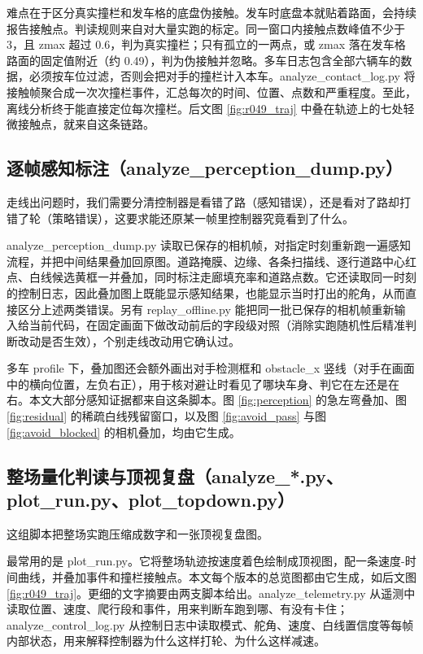 \documentclass[UTF8,a4paper]{ctexart}
\begin{document}
难点在于区分真实撞栏和发车格的底盘伪接触。发车时底盘本就贴着路面，会持续报告接触点。判读规则来自对大量实跑的标定。同一窗口内接触点数峰值不少于 3，且 zmax 超过 0.6，判为真实撞栏；只有孤立的一两点，或 zmax 落在发车格路面的固定值附近（约 0.49），判为伪接触并忽略。多车日志包含全部六辆车的数据，必须按车位过滤，否则会把对手的撞栏计入本车。analyze\_contact\_log.py 将接触帧聚合成一次次撞栏事件，汇总每次的时间、位置、点数和严重程度。至此，离线分析终于能直接定位每次撞栏。后文图 \ref{fig:r049_traj} 中叠在轨迹上的七处轻微接触点，就来自这条链路。

\subsection{逐帧感知标注（analyze\_perception\_dump.py）}

走线出问题时，我们需要分清控制器是看错了路（感知错误），还是看对了路却打错了轮（策略错误），这要求能还原某一帧里控制器究竟看到了什么。

analyze\_perception\_dump.py 读取已保存的相机帧，对指定时刻重新跑一遍感知流程，并把中间结果叠加回原图。道路掩膜、边缘、各条扫描线、逐行道路中心红点、白线候选黄框一并叠加，同时标注走廊填充率和道路点数。它还读取同一时刻的控制日志，因此叠加图上既能显示感知结果，也能显示当时打出的舵角，从而直接区分上述两类错误。另有 replay\_offline.py 能把同一批已保存的相机帧重新输入给当前代码，在固定画面下做改动前后的字段级对照（消除实跑随机性后精准判断改动是否生效），个别走线改动用它确认过。

多车 profile 下，叠加图还会额外画出对手检测框和 obstacle\_x 竖线（对手在画面中的横向位置，左负右正），用于核对避让时看见了哪块车身、判它在左还是在右。本文大部分感知证据都来自这条脚本。图 \ref{fig:perception} 的急左弯叠加、图 \ref{fig:residual} 的稀疏白线残留窗口，以及图 \ref{fig:avoid_pass} 与图 \ref{fig:avoid_blocked} 的相机叠加，均由它生成。

\subsection{整场量化判读与顶视复盘（analyze\_*.py、plot\_run.py、plot\_topdown.py）}

这组脚本把整场实跑压缩成数字和一张顶视复盘图。

最常用的是 plot\_run.py。它将整场轨迹按速度着色绘制成顶视图，配一条速度-时间曲线，并叠加事件和撞栏接触点。本文每个版本的总览图都由它生成，如后文图 \ref{fig:r049_traj}。更细的文字摘要由两支脚本给出。analyze\_telemetry.py 从遥测中读取位置、速度、爬行段和事件，用来判断车跑到哪、有没有卡住；analyze\_control\_log.py 从控制日志中读取模式、舵角、速度、白线置信度等每帧内部状态，用来解释控制器为什么这样打轮、为什么这样减速。
\end{document}
